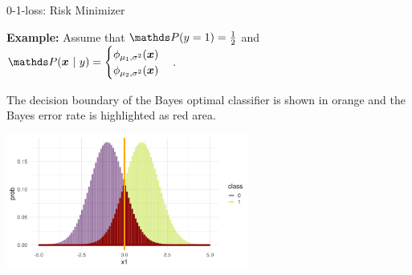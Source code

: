 \begin{vbframe}{0-1-loss: Risk Minimizer}
\framebreak 

\textbf{Example: } Assume that $\P(y = 1) = \frac{1}{2}$ and $
\P(\xv ~|~ y) = \begin{cases}\phi_{\mu_1, \sigma^2}(\xv) \\ \phi_{\mu_2, \sigma^2}(\xv)\end{cases}$.

\lz


The decision boundary of the Bayes optimal classifier is shown in orange and the Bayes error rate is highlighted as red area. 

\begin{center}
\includegraphics[width = 8cm ]{figure_man/bayes_error_5.png} \\
\end{center}

% 
% 

\end{vbframe}

\endlecture


